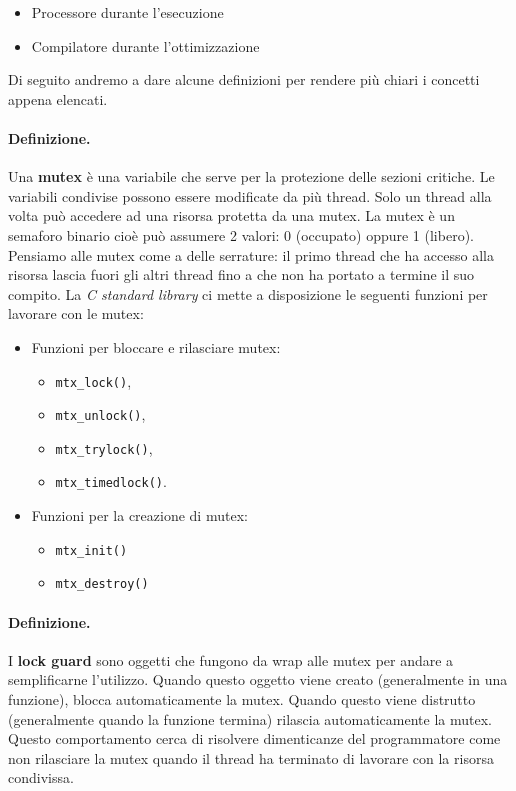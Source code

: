 \begin{itemize}
    \item Processore durante l'esecuzione
    \item Compilatore durante l'ottimizzazione
\end{itemize}

Di seguito andremo a dare alcune definizioni per rendere più chiari i concetti appena elencati.

\paragraph{Definizione.}
Una \textbf{mutex} è una variabile che serve per la protezione delle sezioni critiche.
Le variabili condivise possono essere modificate da più thread.
Solo un thread alla volta può accedere ad una risorsa protetta da una mutex.
La mutex è un semaforo binario cioè può assumere 2 valori: 0 (occupato)
oppure 1 (libero).
Pensiamo alle mutex come a delle serrature:
il primo thread che ha accesso alla risorsa lascia fuori gli altri thread
fino a che non ha portato a termine il suo compito. La \textit{C standard library}
ci mette a disposizione le seguenti funzioni per lavorare con le mutex:

\begin{itemize}
    \item Funzioni per bloccare e rilasciare mutex:
          \begin{itemize}
              \item \verb|mtx_lock()|,
              \item \verb|mtx_unlock()|,
              \item \verb|mtx_trylock()|,
              \item \verb|mtx_timedlock()|.
          \end{itemize}
    \item Funzioni per la creazione di mutex:
          \begin{itemize}
              \item \verb|mtx_init()|
              \item \verb|mtx_destroy()|
          \end{itemize}
\end{itemize}

\paragraph{Definizione.}
I \textbf{lock guard} sono oggetti che fungono da wrap alle mutex per andare a
semplificarne l'utilizzo. Quando questo oggetto viene creato (generalmente in una
funzione), blocca automaticamente la mutex. Quando questo viene distrutto (generalmente
quando la funzione termina) rilascia automaticamente la mutex. Questo comportamento
cerca di risolvere dimenticanze del programmatore come non rilasciare la mutex quando
il thread ha terminato di lavorare con la risorsa condivissa.

